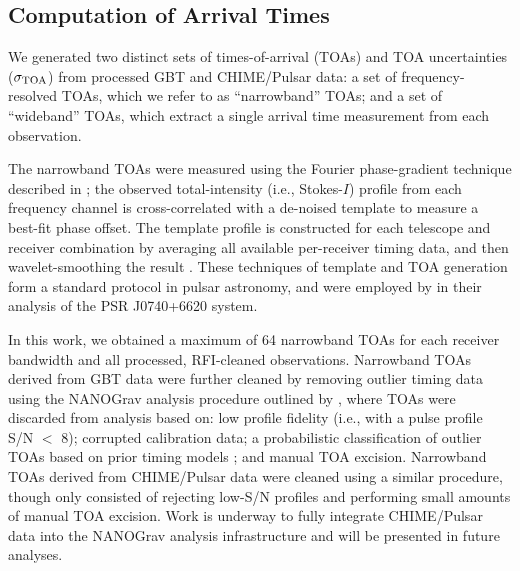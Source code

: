 \documentclass[twocolumn]{aastex63}
\newcommand{\chimepsr}{CHIME/Pulsar}
\begin{document}
\subsection{Computation of Arrival Times}
\label{subsec:toas}

We generated two distinct sets of times-of-arrival (TOAs) and TOA uncertainties ($\sigma_{\rm TOA}$) from processed GBT and \chimepsr{} data: a set of frequency-resolved TOAs, which we refer to as ``narrowband'' TOAs; and a set of ``wideband'' TOAs, which extract a single arrival time measurement from each observation.

The narrowband TOAs were measured using the Fourier phase-gradient technique described in \citet{tay92}; the observed total-intensity (i.e., Stokes-$I$) profile from each frequency channel is cross-correlated with a de-noised template to measure a best-fit phase offset.  The template profile is constructed for each telescope and receiver combination by averaging all available per-receiver timing data, and then wavelet-smoothing the result \citep[e.g.,][]{abb+15}. These techniques of template and TOA generation form a standard protocol in pulsar astronomy, and were employed by \citet{cfr+20} in their analysis of the PSR J0740+6620 system. 

In this work, we obtained a maximum of 64 narrowband TOAs for each receiver bandwidth and all processed, RFI-cleaned observations. Narrowband TOAs derived from GBT data were further cleaned by removing outlier timing data using the NANOGrav analysis procedure outlined by \citet{aab+21a}, where TOAs were discarded from analysis based on: low profile fidelity (i.e., with a pulse profile S/N $<$ 8); corrupted calibration data; a probabilistic classification of outlier TOAs based on prior timing models \citep{vv17}; and manual TOA excision. Narrowband TOAs derived from \chimepsr{} data were cleaned using a similar procedure, though only consisted of rejecting low-S/N profiles and performing small amounts of manual TOA excision. Work is underway to fully integrate \chimepsr{} data into the NANOGrav analysis infrastructure and will be presented in future analyses.
\end{document}
